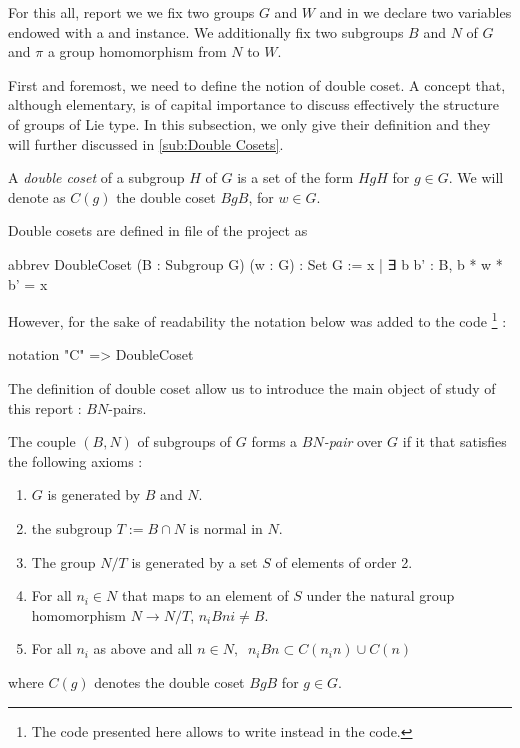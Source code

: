 \label{sub:Definition}

For this all, report we we fix two groups $G$ and $W$ and in \Lean we declare two variables  endowed with a \lean{[Group G]} and \lean{[Group W]} instance. We additionally fix two subgroups $B$ and $N$ of $G$ and $\pi$ a group homomorphism from $N$ to $W$.

First and foremost, we need to define the notion of double coset. A concept that, although elementary, is of capital importance to discuss effectively the structure of groups of Lie type. In this subsection, we only give their definition and they will further discussed in \ref{sub:Double Cosets}.

\begin{definition} \label{def:DC}
    A \emph{double coset} of a subgroup $H$ of $G$ is a set of the form $HgH$ for $g \in G$. We  will denote as $C\left( g \right)$ the double coset $BgB$, for $w \in G$. \end{definition} 

    Double cosets are defined in  file of the project as
    \begin{leancode}
abbrev DoubleCoset (B : Subgroup G) (w : G) : Set G := 
    {x | ∃ b  b' : B, b * w * b' = x}
    \end{leancode} 
    However, for the sake of readability the notation below was added to the code \footnote{The code presented here allows to write  instead  in the code.} :
\begin{leancode}
notation "C"  => DoubleCoset 
\end{leancode}

The definition of double coset allow us to introduce the main object of study of this report : $BN$-pairs. 

\begin{definition}[$BN$-pair] \label{BN}
    The couple $\left( B,N \right)$ of subgroups of $G$ forms a \emph{$BN$-pair} over $G$ if it that satisfies the following axioms :
    \begin{enumerate}
        \item $G$ is generated by $B$ and $N$.
        \item the subgroup $T := B \cap N$ is normal in $N$.
        \item The group $N / T$ is generated by a set $S$ of elements of order 2.
        \item For all $n_{i} \in N$ that maps to an element of $S$ under the natural group homomorphism $N \to N / T$, $n_{i}Bni \neq B$.
        \item For all $n_{i}$ as above and all $n \in N, \ $ $n_i B n \subset C(n_in) \cup C(n)$
    \end{enumerate} where $C(g)$ denotes the double coset $BgB$ for $g \in G$.
\end{definition}

